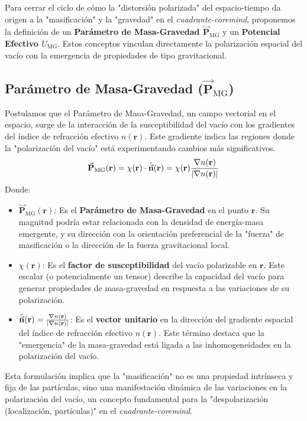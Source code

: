 \documentclass{book}
\newcommand{\bvec}[1]{\vec{\mathbf{#1}}}
\begin{document}
Para cerrar el ciclo de cómo la "distorsión polarizada" del espacio-tiempo da origen a la "masificación" y la "gravedad" en el \textit{cuadrante-coremind}, proponemos la definición de un \textbf{Parámetro de Masa-Gravedad $\bvec{P}_{\text{MG}}$} y un \textbf{Potencial Efectivo $U_{\text{MG}}$}. Estos conceptos vinculan directamente la polarización espacial del vacío con la emergencia de propiedades de tipo gravitacional.

\subsection*{Parámetro de Masa-Gravedad ($\bvec{P}_{\text{MG}}$)}
Postulamos que el Parámetro de Masa-Gravedad, un campo vectorial en el espacio, surge de la interacción de la susceptibilidad del vacío con los gradientes del índice de refracción efectivo $n(\mathbf{r})$. Este gradiente indica las regiones donde la "polarización del vacío" está experimentando cambios más significativos.
\begin{equation}
    \bvec{P}_{\text{MG}}(\mathbf{r}) = \chi(\mathbf{r}) \cdot \hat{\bvec{n}}(\mathbf{r}) = \chi(\mathbf{r}) \frac{\nabla n(\mathbf{r})}{\abs{\nabla n(\mathbf{r})}}
    \label{eq:pmg_definition}
\end{equation}
Donde:
\begin{itemize}
    \item $\bvec{P}_{\text{MG}}(\mathbf{r})$: Es el \textbf{Parámetro de Masa-Gravedad} en el punto $\mathbf{r}$. Su magnitud podría estar relacionada con la densidad de energía-masa emergente, y su dirección con la orientación preferencial de la "fuerza" de masificación o la dirección de la fuerza gravitacional local.
    \item $\chi(\mathbf{r})$: Es el \textbf{factor de susceptibilidad} del vacío polarizable en $\mathbf{r}$. Este escalar (o potencialmente un tensor) describe la capacidad del vacío para generar propiedades de masa-gravedad en respuesta a las variaciones de su polarización.
    \item $\hat{\bvec{n}}(\mathbf{r}) = \frac{\nabla n(\mathbf{r})}{\abs{\nabla n(\mathbf{r})}}$: Es el \textbf{vector unitario} en la dirección del gradiente espacial del índice de refracción efectivo $n(\mathbf{r})$. Este término destaca que la "emergencia" de la masa-gravedad está ligada a las inhomogeneidades en la polarización del vacío.
\end{itemize}
Esta formulación implica que la "masificación" no es una propiedad intrínseca y fija de las partículas, sino una manifestación dinámica de las variaciones en la polarización del vacío, un concepto fundamental para la "despolarización (localización, partículas)" en el \textit{cuadrante-coremind}.
\end{document}
